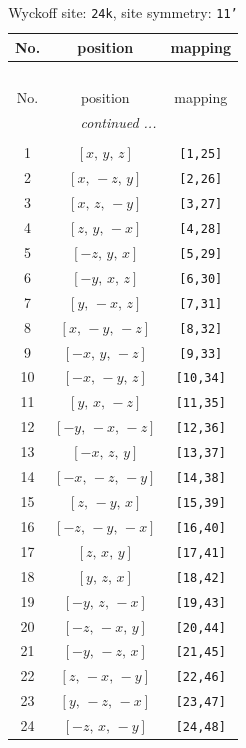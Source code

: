 \documentclass[fleqn,8pt]{jsarticle}
\begin{document}
\begin{longtable}{ccc}
\caption{Wyckoff site: {\tt 24k}, site symmetry: {\tt 11'}}
 \\
 \hline \hline
No. & position & mapping \\ \hline \endfirsthead

\multicolumn{2}{l}{\tablename\ \thetable{}} \\
 \hline \hline
No. & position & mapping \\ \hline \endhead

 \hline \hline
\multicolumn{2}{r}{\footnotesize\it continued ...} \\ \endfoot

 \hline \hline
\multicolumn{2}{r}{} \\ \endlastfoot

1 & $\left[ x,\, y,\, z \right]$ & {\tt [1,25]} \\ \hline
2 & $\left[ x,\, - z,\, y \right]$ & {\tt [2,26]} \\ \hline
3 & $\left[ x,\, z,\, - y \right]$ & {\tt [3,27]} \\ \hline
4 & $\left[ z,\, y,\, - x \right]$ & {\tt [4,28]} \\ \hline
5 & $\left[ - z,\, y,\, x \right]$ & {\tt [5,29]} \\ \hline
6 & $\left[ - y,\, x,\, z \right]$ & {\tt [6,30]} \\ \hline
7 & $\left[ y,\, - x,\, z \right]$ & {\tt [7,31]} \\ \hline
8 & $\left[ x,\, - y,\, - z \right]$ & {\tt [8,32]} \\ \hline
9 & $\left[ - x,\, y,\, - z \right]$ & {\tt [9,33]} \\ \hline
10 & $\left[ - x,\, - y,\, z \right]$ & {\tt [10,34]} \\ \hline
11 & $\left[ y,\, x,\, - z \right]$ & {\tt [11,35]} \\ \hline
12 & $\left[ - y,\, - x,\, - z \right]$ & {\tt [12,36]} \\ \hline
13 & $\left[ - x,\, z,\, y \right]$ & {\tt [13,37]} \\ \hline
14 & $\left[ - x,\, - z,\, - y \right]$ & {\tt [14,38]} \\ \hline
15 & $\left[ z,\, - y,\, x \right]$ & {\tt [15,39]} \\ \hline
16 & $\left[ - z,\, - y,\, - x \right]$ & {\tt [16,40]} \\ \hline
17 & $\left[ z,\, x,\, y \right]$ & {\tt [17,41]} \\ \hline
18 & $\left[ y,\, z,\, x \right]$ & {\tt [18,42]} \\ \hline
19 & $\left[ - y,\, z,\, - x \right]$ & {\tt [19,43]} \\ \hline
20 & $\left[ - z,\, - x,\, y \right]$ & {\tt [20,44]} \\ \hline
21 & $\left[ - y,\, - z,\, x \right]$ & {\tt [21,45]} \\ \hline
22 & $\left[ z,\, - x,\, - y \right]$ & {\tt [22,46]} \\ \hline
23 & $\left[ y,\, - z,\, - x \right]$ & {\tt [23,47]} \\ \hline
24 & $\left[ - z,\, x,\, - y \right]$ & {\tt [24,48]} \\
\end{longtable}
\end{document}
